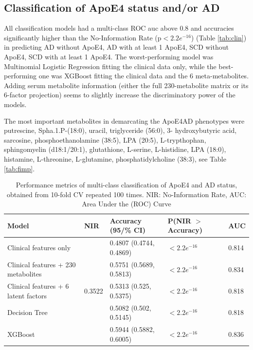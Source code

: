 \documentclass{amsart}
\begin{document}
\subsection{Classification of ApoE4 status and/or AD}
All classification models had a multi-class ROC \acrshort{auc} above 0.8 and accuracies significantly higher than the No-Information Rate (p$<2.2e^{-16}$) (Table \ref{tab:clin}) in predicting AD without ApoE4, AD with at least 1 ApoE4, SCD without ApoE4, SCD with at least 1 ApoE4. The worst-performing model was  Multinomial Logistic Regression fitting the clinical data only, while the best-performing one was XGBoost fitting the clinical data and the 6 meta-metabolites. Adding serum metabolite information (either the full 230-metabolite matrix or its 6-factor projection) seems to slightly increase the discriminatory power of the models.

The most important metabolites in demarcating the ApoE4AD phenotypes were putrescine, Spha.1.P-(18:0), uracil, triglyceride (56:0), 3- hydroxybutyric acid, sarcosine, phosphoethanolamine (38:5), LPA (20:5), L-trypthophan, sphingomyelin (d18:1/20:1), glutathione, L-serine, L-histidine, LPA (18:0), histamine, L-threonine, L-glutamine, phosphatidylcholine (38:3), see Table \ref{tab:fimp}.
\begin{table}[H]
\caption{Performance metrics of multi-class classification of ApoE4 and AD status, obtained from 10-fold CV repeated 100 times. NIR: No-Information Rate, AUC: Area Under the (ROC) Curve}
\label{tab:class_results}
\begin{tabular}{lllll} \toprule
Model & NIR & Accuracy (95/\% CI)     & P(NIR $>$ Accuracy) & AUC   \\ \midrule
Clinical features only & \multirow{5}{*}{0.3522} & 0.4807 (0.4744, 0.4869) &$<2.2e^{-16}$ & 0.814 \\
Clinical features + 230 metabolites  &     & 0.5751 (0.5689, 0.5813) & $<2.2e^{-16}$      & 0.834 \\
Clinical features + 6 latent factors &     & 0.5313 (0.525, 0.5375)  & $<2.2e^{-16}$      & 0.818 \\
Decision Tree                        &     & 0.5082 (0.502, 0.5145)  & $<2.2e^{-16}$      & 0.818 \\
XGBoost                              &     & 0.5944 (0.5882, 0.6005) & $<2.2e^{-16}$      & 0.836 \\ \bottomrule
\end{tabular}
\end{table}
\end{document}
